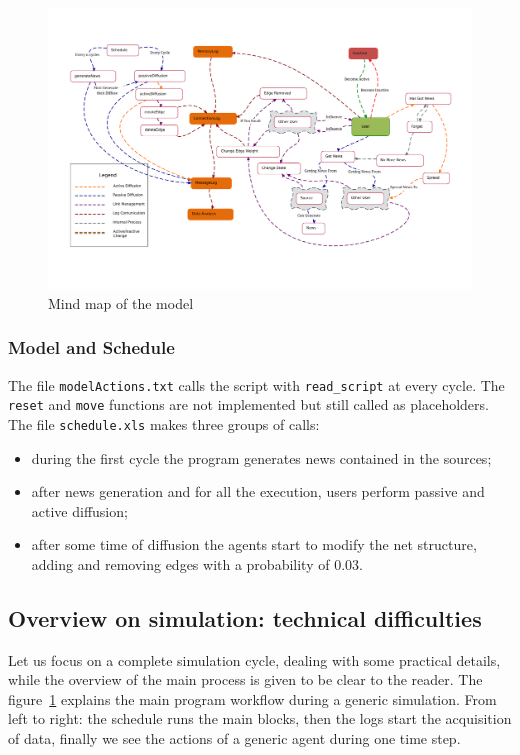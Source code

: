 \begin{figure}[htpb]
  \centering
  \includegraphics[trim={1.9cm 3cm 1.5cm 2cm}, clip,width=\columnwidth]{img/pdf/mindMap.pdf}
  \caption{Mind map of the model}
  \label{fig:mindmap}
\end{figure}

\subsubsection{Model and Schedule}
The file \texttt{modelActions.txt} calls the script with
\texttt{read\_script} at every cycle.
The \texttt{reset} and \texttt{move} functions are not implemented
but still called as placeholders.
The file \texttt{schedule.xls} makes three groups of calls:
\begin{itemize}
\item [timestep 1] during the first cycle the program generates news
  contained in the sources;
\item [timesteps 2 - 10000] after news generation and for all
  the execution, users perform passive and active diffusion;
\item [timesteps 10 - 10000] after some time of diffusion the agents start
  to modify the net structure, adding and removing edges with a probability
  of 0.03.
\end{itemize}

\subsection{Overview on simulation: technical difficulties}
Let us focus on a complete simulation cycle, dealing with some
practical details, while the overview of the main process is given to be
clear to the reader. The figure~\ref{fig:mindmap} explains the main program
workflow during a generic simulation.
From left to right: the schedule runs the main blocks, then the logs start
the acquisition of data, finally we see the actions of a generic agent
during one time step.

